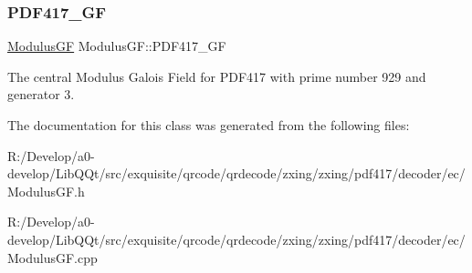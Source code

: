 \subsubsection{\texorpdfstring{P\+D\+F417\+\_\+\+GF}{PDF417\_GF}}
{\footnotesize\ttfamily \mbox{\hyperlink{classzxing_1_1pdf417_1_1decoder_1_1ec_1_1_modulus_g_f}{Modulus\+GF}} Modulus\+G\+F\+::\+P\+D\+F417\+\_\+\+GF\hspace{0.3cm}{\ttfamily [static]}}

The central Modulus Galois Field for P\+D\+F417 with prime number 929 and generator 3. 

The documentation for this class was generated from the following files\+:\begin{DoxyCompactItemize}
\item 
R\+:/\+Develop/a0-\/develop/\+Lib\+Q\+Qt/src/exquisite/qrcode/qrdecode/zxing/zxing/pdf417/decoder/ec/Modulus\+G\+F.\+h\item 
R\+:/\+Develop/a0-\/develop/\+Lib\+Q\+Qt/src/exquisite/qrcode/qrdecode/zxing/zxing/pdf417/decoder/ec/Modulus\+G\+F.\+cpp\end{DoxyCompactItemize}
